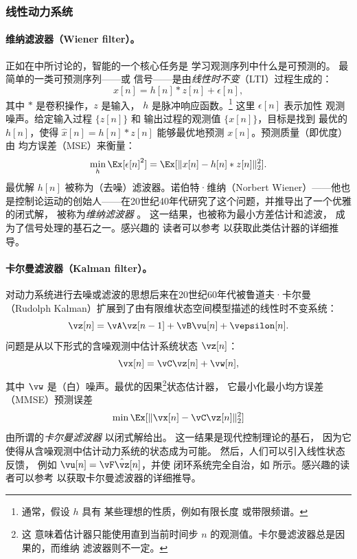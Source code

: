 \documentclass[../../book-main_zh.tex]{subfiles}
\begin{document}
\subsubsection{线性动力系统} \label{sec:linear-systems}

\vspace{2mm}
\paragraph{维纳滤波器（Wiener filter）。}
正如在中所讨论的，智能的一个核心任务是
学习观测序列中什么是可预测的。
最简单的一类可预测序列——或
信号——是由\textit{线性时不变}（LTI）过程生成的：
\begin{equation}
    x[n] = h[n]*z[n] + \epsilon[n],
    \label{eqn:Wiener-model}
\end{equation}
其中 \(*\) 是卷积操作，\(z\) 是输入，
\(h\) 是脉冲响应函数。\footnote{通常，假设 \(h\) 具有
    某些理想的性质，例如有限长度
或带限频谱。} 这里 \(\epsilon[n]\) 表示加性
观测噪声。给定输入过程 \(\{z[n]\}\) 和
输出过程的观测值 \(\{x[n]\}\)，目标是找到
最优的 \(h[n]\)，使得 \(\hat{x}[n] = h[n]*z[n]\) 能够最优地预测
\(x[n]\)。预测质量（即优度）由
均方误差（MSE）来衡量：
\begin{equation}
    \min_{h} \Ex[\epsilon[n]^{2}] = \Ex[\|x[n] - h[n]*z[n]\|_{2}^{2}].
    \label{eqn:wiener-mse}
\end{equation}
最优解 \(h[n]\) 被称为（去噪）滤波器。诺伯特·维纳（Norbert
Wiener）——他也是控制论运动的创始人——在20世纪40年代研究了这个问题，并推导出了一个优雅的闭式解，
被称为\textit{维纳滤波器} \cite{Wiener-1942,Wiener-1949}。
这一结果，也被称为最小方差估计和滤波，
成为了信号处理的基石之一。感兴趣的
读者可以参考 \cite[附录 B]{MaY2003} 以获取此类估计器的详细推导。

\paragraph{卡尔曼滤波器（Kalman filter）。}
对动力系统进行去噪或滤波的思想后来在20世纪60年代被鲁道夫·卡尔曼（Rudolph Kalman）扩展到了由有限维状态空间模型描述的线性时不变系统：
\begin{equation}
    \vz[n] = \vA \vz[n-1] + \vB\vu[n] + \vepsilon[n].
    \label{eqn:linear-state-space}
\end{equation}
问题是从以下形式的含噪观测中估计系统状态 \(\vz[n]\)：
\begin{equation}
    \vx[n] = \vC \vz[n] + \vw[n],
    \label{eqn:Kalman-model}
\end{equation}
其中 \(\vw\) 是（白）噪声。最优的因果\footnote{这
    意味着估计器只能使用直到当前时间步 \(n\) 的观测值。卡尔曼滤波器总是因果的，而维纳
滤波器则不一定。}状态估计器，
它最小化最小均方误差
（MMSE）预测误差
\begin{equation}
    \min \Ex[ \|\vx[n] - \vC\vz[n]\|_{2}^{2}]
    \label{eqn:kalman-mse}
\end{equation}
由所谓的\textit{卡尔曼滤波器} \cite{kalman1960new} 以闭式解给出。
这一结果是现代控制理论的基石，
因为它使得从含噪观测中估计动力系统的状态成为可能。
然后，人们可以引入线性状态反馈，
例如 \(\vu[n] = \vF \hat{\vz}[n]\)，并使
闭环系统完全自治，如
 所示。感兴趣的读者可以参考
\cite[附录 B]{MaY2003} 以获取卡尔曼滤波器的详细推导。
\end{document}
